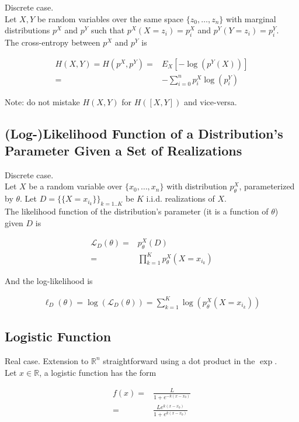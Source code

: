 \documentclass{article}
\begin{document}
Discrete case.\\
Let $X,Y$ be  random variables over the same space  $\{z_0, \dots, z_n\}$  with  marginal distributions $p^X$ and $p^Y$ such that $p^X(X = z_i) = p^X_i$ and $p^Y(Y = z_i) = p^Y_i$.\\
The cross-entropy between $p^X$ and $p^Y$ is

\begin{eqnarray*}
	H(X,Y) = H(p^X,p^Y) =& E_{X}[-\log(p^Y(X))] \\
	=& - \sum_{i=0}^n  p^X_{i} \log(p^Y_i)
\end{eqnarray*}

Note: do not mistake $H(X,Y)$ for $H([X,Y])$ and vice-versa.


\subsection{(Log-)Likelihood Function of a Distribution's Parameter Given a Set of Realizations}

Discrete case.\\
Let $X$ be a random variable over $\{x_0, \dots, x_n\}$ with distribution $p^X_\theta$, parameterized by $\theta$. Let $D = \big \{\{X = x_{i_k}\} \big \}_{k=1..K}$ be $K$ i.i.d. realizations of $X$.\\
The likelihood function of the distribution's parameter (it is a function of $\theta$) given $D$ is

\begin{eqnarray*}
	\mathcal{L}_D(\theta) =& p^X_\theta(D) \\
							=& \prod_{k=1}^K p^X_\theta(X=x_{i_k})
\end{eqnarray*}

And the log-likelihood is

\begin{eqnarray*}
	\ell_D(\theta) = \log(\mathcal{L}_D(\theta)) = \sum_{k=1}^K \log(p^X_\theta(X=x_{i_k}))
\end{eqnarray*}

\subsection{Logistic Function}

Real case. Extension to $\mathbb{R}^n$ straightforward using a dot product in the $\exp$.\\
Let $x \in \mathbb{R}$, a logistic function has the form

\begin{eqnarray*}
	f(x) =& \frac{L}{1+e^{-k(x-x_0)}} \\
			=& \frac{L e^{k(x-x_0)}}{1+e^{k(x-x_0)}} \\
\end{eqnarray*}
\end{document}
